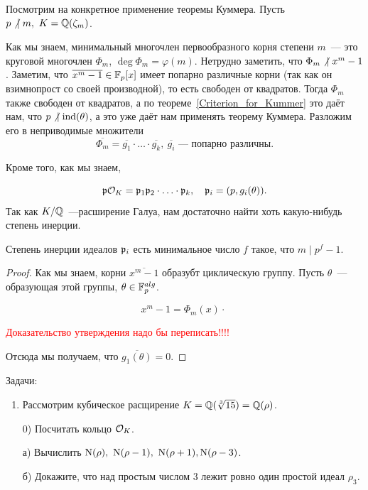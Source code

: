  	\begin{example}
 		Посмотрим на конкретное применение теоремы Куммера. Пусть $p \not \ \mid m, \ K = \mathbb{Q}(\zeta_m)$.

 		Как мы знаем, минимальный многочлен первообразного корня степени $m$~--- это круговой многочлен $\Phi_{m}$, $\deg{\Phi_{m}} = \varphi(m)$. Нетрудно заметить, что $\Phi_{m} \not \ \mid x^m - 1$. Заметим, что $\overline{x^m - 1} \in \mathbb{F}_{p}[x]$ имеет попарно различные корни (так как он взимнопрост со своей производной), то есть свободен от квадратов. Тогда $\Phi_{m}$ также свободен от квадратов, а по теореме~\ref{Criterion_for_Kummer} это даёт нам, что $p \not \ \mid \ind\lr*{\theta}$, а это уже даёт нам применять теорему Куммера. Разложим его в неприводимые множители 
 		\[
 			\overline{\Phi_{m}} = \overline{g_1} \cdot \ldots \cdot \overline{g_k}, \ \overline{g_i} \text{~--- попарно различны}.
 		\]

 		Кроме того, как мы знаем,

 		\[
 			\mathfrak{p} \mathcal{O}_{K} = \mathfrak{p}_1 \mathfrak{p}_2 \cdot \ldots \cdot \mathfrak{p}_{k}, \quad \mathfrak{p}_{i} = (p, g_{i}(\theta)).
 		\]
 		Так как $K/\mathbb{Q}$~---расширение Галуа, нам достаточно найти хоть какую-нибудь степень инерции. 

 		\begin{statement} 
 			Степень инерции идеалов $\mathfrak{p}_i$ есть минимальное число $f$ такое, что $m \mid p^f - 1 $.
 		\end{statement}
 		\begin{proof}
 			Как мы знаем, корни $\overline{x^m - 1}$ образубт циклическую группу. Пусть $\theta$~--- образующая этой группы, $\theta \in \mathbb{F}_{p}^{alg}$. 

 		\[
 			x^m - 1 = \Phi_{m}(x) \cdot \
 		\]

 		\textcolor{red}{Доказательство утверждения надо бы переписать!!!!}

 		Отсюда мы получаем, что $\overline{g_1(\theta)} = 0$.	
 		\end{proof}

 		\begin{homework}
 			Задачи:
 			\begin{enumerate}
 				\item Рассмотрим кубическое расщирение $K = \mathbb{Q}(\sqrt[3]{15}) = \mathbb{Q}(\rho)$. 

 				0) Посчитать кольцо $\mathcal{O}_{K}$.

 				а) Вычислить $\Nm(\rho), \ \Nm(\rho - 1), \ \Nm(\rho + 1), \Nm(\rho - 3)$.

 				б) Докажите, что над простым числом 3 лежит ровно один простой идеал $\rho_3$.


\end{enumerate}
\end{homework}
\end{example}

